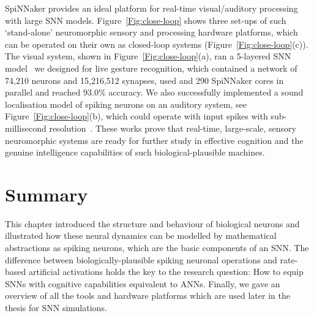 SpiNNaker provides an ideal platform for real-time visual/auditory processing with large SNN models.
Figure~\ref{Fig:close-loop} shows three set-ups of such `stand-alone' neuromorphic sensory and processing hardware platforms, which can be operated on their own as closed-loop systems (Figure~\ref{Fig:close-loop}(c)).
The visual system, shown in Figure~\ref{Fig:close-loop}(a), ran a 5-layered SNN model~\citep{liu2014real} we designed for live gesture recognition, which contained a network of 74,210 neurons and 15,216,512 synapses, used and 290 SpiNNaker cores in parallel and reached 93.0\% accuracy. 
We also successfully implemented a sound localisation model of spiking neurons on an auditory system, see Figure~\ref{Fig:close-loop}(b), which could operate with input spikes with sub-millisecond resolution~\citep{lagorce2015breaking}.
These works prove that real-time, large-scale, sensory neuromorphic systems are ready for further study in effective cognition and the genuine intelligence capabilities of such biological-plausible machines.

\section{Summary}
This chapter introduced the structure and behaviour of biological neurons and illustrated how these neural dynamics can be modelled by mathematical abstractions as spiking neurons, which are the basic components of an SNN.
The difference between biologically-plausible spiking neuronal operations and rate-based artificial activations holds the key to the research question: How to equip SNNs with cognitive capabilities equivalent to ANNs.
Finally, we gave an overview of all the tools and hardware platforms which are used later in the thesis for SNN simulations.
